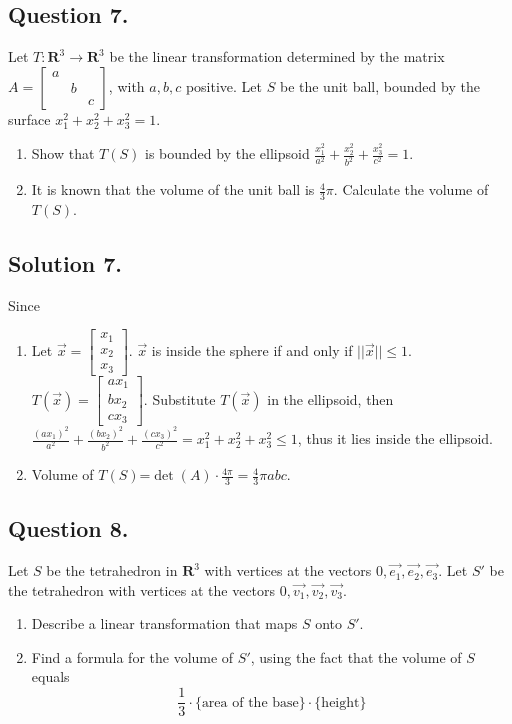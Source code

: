 \documentclass{article}
\begin{document}
\subsection*{Question 7.}
Let $T:\mathbf{R}^3\to\mathbf{R}^3$ be the linear transformation determined by the matrix $A=\left[\begin{array}{lll}a\\&b\\&&c\end{array}\right]$, with $a,b,c$ positive. Let $S$ be the unit ball, bounded by the surface $x_1^2+x_2^2+x_3^2=1$.
\begin{enumerate} [label=(\arabic*)]
    \item Show that $T(S)$ is bounded by the ellipsoid $\frac{x_1^2}{a^2}+\frac{x_2^2}{b^2}+\frac{x_3^2}{c^2}=1$.
    \item It is known that the volume of the unit ball is $\frac{4}{3}\pi$. Calculate the volume of $T(S)$.
\end{enumerate}
\subsection*{Solution 7.}
Since

\begin{enumerate} [label=(\arabic*)]
    \item Let $\Vec{x}=\left[\begin{array}{r}x_1\\x_2\\x_3\end{array}\right]$. $\Vec{x}$ is inside the sphere if and only if $||\Vec{x}||\leq 1$. $T(\Vec{x})=\left[\begin{array}{r}ax_1\\bx_2\\cx_3\end{array}\right]$. Substitute $T(\Vec{x})$ in the ellipsoid, then $\frac{(ax_1)^2}{a^2}+\frac{(bx_2)^2}{b^2}+\frac{(cx_3)^2}{c^2}=x_1^2+x_2^2+x_3^2\leq 1$, thus it lies inside the ellipsoid.
    \item Volume of $T(S)$=$\det(A)\cdot\frac{4\pi}{3}=\frac{4}{3}\pi abc$.
\end{enumerate}
\subsection*{Question 8.}
Let $S$ be the tetrahedron in $\mathbf{R}^3$ with vertices at the vectors $0,\Vec{e_1},\Vec{e_2},\Vec{e_3}$. Let $S'$ be the tetrahedron with vertices at the vectors $0,\Vec{v_1},\Vec{v_2},\Vec{v_3}$.
\begin{enumerate} [label=(\arabic*)]
    \item Describe a linear transformation that maps $S$ onto $S'$.
    \item Find a formula for the volume of $S'$, using the fact that the volume of $S$ equals 
    \[\frac{1}{3}\cdot \{\text{area of the base}\}\cdot \{\text{height}\}\]
\end{enumerate}
\end{document}
